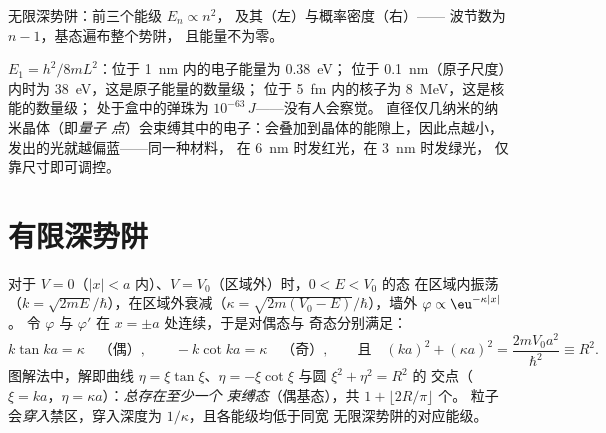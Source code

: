\begin{omfigure}

{\small 无限深势阱：前三个能级 $E_n \propto n^2$，
及其（左）与概率密度（右）——
波节数为 $n - 1$，基态遍布整个势阱，
且能量不为零。}
\end{omfigure}

\begin{example}[数量级与颜色]\label{ex:b2:potential-wells-tunneling:orders}
$E_1 = h^2/8mL^2$：位于 \qty{1}{nm} 内的电子能量为 \qty{0.38}{eV}；
位于 \qty{0.1}{nm}（原子尺度）内时为 \qty{38}{eV}，这是原子能量的数量级；
位于 \qty{5}{fm} 内的核子为 \qty{8}{MeV}，这是核能的数量级；
处于盒中的弹珠为 $10^{-63}\,\unit{J}$——没有人会察觉。
直径仅几纳米的纳米晶体（即\emph{量子
点}）会束缚其中的电子：会叠加到晶体的能隙上，因此点越小，
发出的光就越偏蓝——同一种材料，
在 \qty{6}{nm} 时发红光，在 \qty{3}{nm} 时发绿光，
仅靠尺寸即可调控。
\end{example}

\section{有限深势阱}

\begin{proposition}[有限深势阱]\label{prop:b2:potential-wells-tunneling:finite}
对于 $V = 0$（$|x| < a$ 内）、$V = V_0$（区域外）时，$0 < E < V_0$ 的态
在区域内振荡（$k = \sqrt{2mE}/\hbar$），在区域外衰减（$\kappa =
\sqrt{2m(V_0 - E)}/\hbar$），墙外 $\varphi \propto \eu^{-\kappa|x|}$。
令 $\varphi$ 与 $\varphi'$ 在 $x = \pm a$ 处连续，于是对偶态与
奇态分别满足：
\[
k\tan ka = \kappa \quad\text{（偶）}, \qquad
-k\cot ka = \kappa \quad\text{（奇）}, \qquad\text{且}\quad
(ka)^2 + (\kappa a)^2 = \frac{2mV_0a^2}{\hbar^2} \equiv R^2 .
\]
图解法中，解即曲线 $\eta =
\xi\tan\xi$、$\eta = -\xi\cot\xi$ 与圆 $\xi^2 + \eta^2 = R^2$ 的
交点（$\xi = ka$，$\eta = \kappa a$）：\emph{总存在至少一个
束缚态}（偶基态），共 $1 + \lfloor 2R/\pi\rfloor$ 个。
粒子会\emph{穿入}禁区，穿入深度为
$1/\kappa$，且各能级均低于同宽
无限深势阱的对应能级。
\end{proposition}

